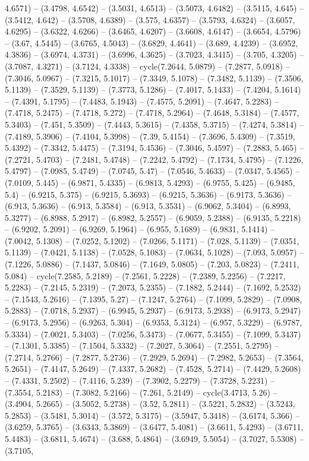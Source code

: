 4.6571) -- (3.4798, 4.6542) -- (3.5031, 4.6513) -- (3.5073, 4.6482) -- (3.5115, 4.645) -- (3.5412, 4.642) -- (3.5708, 4.6389) -- (3.575, 4.6357) -- (3.5793, 4.6324) -- (3.6057, 4.6295) -- (3.6322, 4.6266) -- (3.6465, 4.6207) -- (3.6608, 4.6147) -- (3.6654, 4.5796) -- (3.67, 4.5445) -- (3.6765, 4.5043) -- (3.6829, 4.4641) -- (3.689, 4.4239) -- (3.6952, 4.3836) -- (3.6974, 4.3731) -- (3.6996, 4.3625) -- (3.7023, 4.3415) -- (3.705, 4.3205) -- (3.7087, 4.3271) -- (3.7124, 4.3338) -- cycle(7.2644, 5.0879) -- (7.2877, 5.0918) -- (7.3046, 5.0967) -- (7.3215, 5.1017) -- (7.3349, 5.1078) -- (7.3482, 5.1139) -- (7.3506, 5.1139) -- (7.3529, 5.1139) -- (7.3773, 5.1286) -- (7.4017, 5.1433) -- (7.4204, 5.1614) -- (7.4391, 5.1795) -- (7.4483, 5.1943) -- (7.4575, 5.2091) -- (7.4647, 5.2283) -- (7.4718, 5.2475) -- (7.4718, 5.272) -- (7.4718, 5.2964) -- (7.4648, 5.3184) -- (7.4577, 5.3403) -- (7.451, 5.3509) -- (7.4443, 5.3615) -- (7.4358, 5.3715) -- (7.4274, 5.3814) -- (7.4189, 5.3906) -- (7.4104, 5.3998) -- (7.39, 5.4154) -- (7.3696, 5.4309) -- (7.3519, 5.4392) -- (7.3342, 5.4475) -- (7.3194, 5.4536) -- (7.3046, 5.4597) -- (7.2883, 5.465) -- (7.2721, 5.4703) -- (7.2481, 5.4748) -- (7.2242, 5.4792) -- (7.1734, 5.4795) -- (7.1226, 5.4797) -- (7.0985, 5.4749) -- (7.0745, 5.47) -- (7.0546, 5.4633) -- (7.0347, 5.4565) -- (7.0109, 5.445) -- (6.9871, 5.4335) -- (6.9813, 5.4293) -- (6.9755, 5.425) -- (6.9485, 5.4) -- (6.9215, 5.375) -- (6.9215, 5.3693) -- (6.9215, 5.3636) -- (6.9173, 5.3636) -- (6.913, 5.3636) -- (6.913, 5.3584) -- (6.913, 5.3531) -- (6.9062, 5.3404) -- (6.8993, 5.3277) -- (6.8988, 5.2917) -- (6.8982, 5.2557) -- (6.9059, 5.2388) -- (6.9135, 5.2218) -- (6.9202, 5.2091) -- (6.9269, 5.1964) -- (6.955, 5.1689) -- (6.9831, 5.1414) -- (7.0042, 5.1308) -- (7.0252, 5.1202) -- (7.0266, 5.1171) -- (7.028, 5.1139) -- (7.0351, 5.1139) -- (7.0421, 5.1138) -- (7.0528, 5.1083) -- (7.0634, 5.1028) -- (7.093, 5.0957) -- (7.1226, 5.0886) -- (7.1437, 5.0846) -- (7.1649, 5.0805) -- (7.203, 5.0823) -- (7.2411, 5.084) -- cycle(7.2585, 5.2189) -- (7.2561, 5.2228) -- (7.2389, 5.2256) -- (7.2217, 5.2283) -- (7.2145, 5.2319) -- (7.2073, 5.2355) -- (7.1882, 5.2444) -- (7.1692, 5.2532) -- (7.1543, 5.2616) -- (7.1395, 5.27) -- (7.1247, 5.2764) -- (7.1099, 5.2829) -- (7.0908, 5.2883) -- (7.0718, 5.2937) -- (6.9945, 5.2937) -- (6.9173, 5.2938) -- (6.9173, 5.2947) -- (6.9173, 5.2956) -- (6.9263, 5.304) -- (6.9353, 5.3124) -- (6.957, 5.3229) -- (6.9787, 5.3334) -- (7.0021, 5.3403) -- (7.0256, 5.3473) -- (7.0677, 5.3455) -- (7.1099, 5.3437) -- (7.1301, 5.3385) -- (7.1504, 5.3332) -- (7.2027, 5.3064) -- (7.2551, 5.2795) -- (7.2714, 5.2766) -- (7.2877, 5.2736) -- (7.2929, 5.2694) -- (7.2982, 5.2653) -- (7.3564, 5.2651) -- (7.4147, 5.2649) -- (7.4337, 5.2682) -- (7.4528, 5.2714) -- (7.4429, 5.2608) -- (7.4331, 5.2502) -- (7.4116, 5.239) -- (7.3902, 5.2279) -- (7.3728, 5.2231) -- (7.3554, 5.2183) -- (7.3082, 5.2166) -- (7.261, 5.2149) -- cycle(3.4713, 5.26) -- (3.4904, 5.2665) -- (3.5052, 5.2738) -- (3.52, 5.2811) -- (3.5221, 5.2832) -- (3.5243, 5.2853) -- (3.5481, 5.3014) -- (3.572, 5.3175) -- (3.5947, 5.3418) -- (3.6174, 5.366) -- (3.6259, 5.3765) -- (3.6343, 5.3869) -- (3.6477, 5.4081) -- (3.6611, 5.4293) -- (3.6711, 5.4483) -- (3.6811, 5.4674) -- (3.688, 5.4864) -- (3.6949, 5.5054) -- (3.7027, 5.5308) -- (3.7105, 